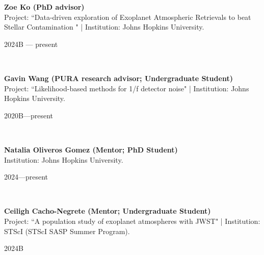 \documentclass[12pt, a4paper]{article} %
\begin{document}
\begin{minipage}[t]{0.7\textwidth}
\begin{flushleft}%
  \setlength{\leftskip}{0.2cm}%
\textbf{Zoe Ko (PhD advisor)}\\
Project: ``Data-driven exploration of Exoplanet Atmospheric Retrievals to beat Stellar Contamination " | Institution: Johns Hopkins University.
\end{flushleft}
\end{minipage}
\begin{minipage}[t]{0.3\textwidth}
\hfill 2024B --- present
\end{minipage}\\

\begin{minipage}[t]{0.7\textwidth}
\begin{flushleft}%
  \setlength{\leftskip}{0.2cm}%
\textbf{Gavin Wang (PURA research advisor; Undergraduate Student)}\\
Project: ``Likelihood-based methods for 1/f detector noise" | Institution: Johns Hopkins University.
\end{flushleft}
\end{minipage}
\begin{minipage}[t]{0.3\textwidth}
\hfill 2020B---present
\end{minipage}\\


\begin{minipage}[t]{0.7\textwidth}
\begin{flushleft}%
  \setlength{\leftskip}{0.2cm}%
\textbf{Natalia Oliveros Gomez (Mentor; PhD Student)}\\
Institution: Johns Hopkins University.
\end{flushleft}
\end{minipage}
\begin{minipage}[t]{0.3\textwidth}
\hfill 2024---present
\end{minipage}\\

\begin{minipage}[t]{0.7\textwidth}
\begin{flushleft}%
  \setlength{\leftskip}{0.2cm}%
\textbf{Ceiligh Cacho-Negrete (Mentor; Undergraduate Student)}\\
Project: ``A population study of exoplanet atmospheres with JWST" | Institution: STScI (STScI SASP Summer Program).
\end{flushleft}
\end{minipage}
\begin{minipage}[t]{0.3\textwidth}
\hfill 2024B
\end{minipage}\\
\end{document}

